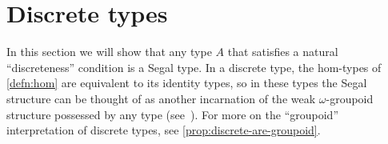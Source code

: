 \documentclass{amsart}
\theoremstyle{plain}
\theoremstyle{definition}
\theoremstyle{remark}
\numberwithin{equation}{section}
\newcommand{\idfunc}[1]{\mathsf{Id}_{#1}}
\newcommand{\two}{\mathbb{2}}
\newcommand{\iscomp}[2]{\mathsf{comp}_{#1,#2}}
\begin{document}
\begin{comment}
The geometric idea is to observe that the square $\two \times \two \to C$
\[
\begin{tikzcd}[column sep=huge]
jfa \arrow[r, "{\delta\circ\beta}_{fa}"] \arrow[dr, "{\delta\circ\beta}_{(\gamma\circ\alpha)_a}" description] \arrow[d, "j(\gamma\circ\alpha)_a"'] & \ell fa \arrow[d, "\ell(\gamma\circ\alpha)_a"] \\ jha \arrow[r, "(\delta\circ\beta)_{ha}"'] & \ell ha
\end{tikzcd}
\]
defining the component of $(\delta\circ\beta)\ast(\gamma\circ\alpha)$ at $a : A$ appears as an interior face of a diagram $\Delta^2 \times \Delta^2 \to C$
\[
\begin{tikzcd}
jfa \arrow[r, "\beta_{fa}"] \arrow[dr, "\beta_{\alpha_a}" description] \arrow[d, "j\alpha_a"'] & kfa \arrow[d, "k\alpha_a"] \arrow[r, "\delta_{fa}"] \arrow[dr, "\delta_{\alpha_a}" description] & \ell fa \arrow[d, "\ell \alpha_a"] \\ jga \arrow[d, "j\gamma_a"'] \arrow[r, "\beta_{ga}"'] \arrow[dr, "\beta_{\gamma_a}" description] & kga \arrow[r, "\delta_{ga}"'] \arrow[dr, "\delta_{\gamma_a}" description] \arrow[d, "k\gamma_a"]  & \ell ga \arrow[d, "j\gamma_a"] \\ jha \arrow[r, "\beta_{ha}"'] & kha \arrow[r, "\delta_{ha}"'] & jha
\end{tikzcd}
\]
The ``diagonal 2-simplex'' in this larger diagram defines a witness that $\delta_{\gamma_a} \circ\beta_{\alpha_a} = (\delta\circ\beta)_{(\gamma\circ\alpha)_a}$. This diagram is simply the composite of the ``uncurried'' maps
\[
\xymatrix@C=50pt{
A \times \Delta^2 \times\Delta^2 \ar[r]^-{{\iscomp \gamma \alpha}\times\idfunc{\Delta^2}} & B \times\Delta^2 \ar[r]^-{\iscomp \delta \beta} & C
}
\]
The diagonal 2-simplex $\Delta^2 \to \Delta^2 \times \Delta^2$ defines the desired witness that $(\delta\circ\beta)\ast(\gamma\circ\alpha)$ is a composite of $(\beta\ast\alpha)$ followed by $(\delta\ast\gamma)$.

TODO: Figure out how to re-express all of this as saying that since $B$ and $C$ are Segal something or other is contractible.
\end{comment}


\section{Discrete types}
\label{sec:discrete-types}

In this section we will show that any type $A$ that satisfies a natural ``discreteness'' condition is a Segal type.  In a discrete type, the hom-types of \cref{defn:hom} are equivalent to its identity types, so in these types the Segal structure can be thought of as another incarnation of the weak $\omega$-groupoid structure possessed by any type (see~\cite{vdbg:oogpds,pll:oogpds}). For more on the ``groupoid'' interpretation of discrete types, see \cref{prop:discrete-are-groupoid}.
\end{document}
